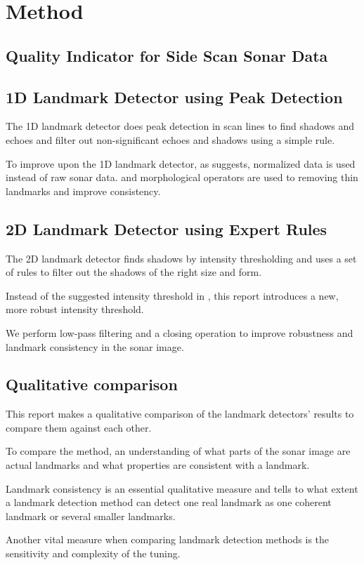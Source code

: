 \chapter{Method}

\section{Quality Indicator for Side Scan Sonar Data}


\section{1D Landmark Detector using Peak Detection}

The 1D landmark detector does peak detection in scan lines to find shadows and echoes and filter out non-significant echoes and shadows using a simple rule.

To improve upon the 1D landmark detector, as \cite{Al-Rawi2017LandmarkImages} suggests, normalized data is used instead of raw sonar data. and morphological operators are used to removing thin landmarks and improve consistency. 

\section{2D Landmark Detector using Expert Rules}

The 2D landmark detector finds shadows by intensity thresholding and uses a set of rules to filter out the shadows of the right size and form. 

Instead of the suggested intensity threshold in \cite{Leblond2019SonarProject}, this report introduces a new, more robust intensity threshold.

We perform low-pass filtering and a closing operation to improve robustness and landmark consistency in the sonar image.

\section{Qualitative comparison}

 This report makes a qualitative comparison of the landmark detectors' results to compare them against each other.

To compare the method, an understanding of what parts of the sonar image are actual landmarks and what properties are consistent with a landmark. 

Landmark consistency is an essential qualitative measure and tells to what extent a landmark detection method can detect one real landmark as one coherent landmark or several smaller landmarks. 

Another vital measure when comparing landmark detection methods is the sensitivity and complexity of the tuning.



